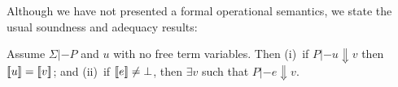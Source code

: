 \begin{comment}
Types do not matter at all for our denotational semantics.
\begin{lemma}[Type irrelevance]
It is the case that $\interp{u}{\sigma}{\rho} = \interp{u[\ol{\tau}/\as]}{\sigma}{\rho}$
for any type substitution of variable $\as$ to types $\taus$.
\end{lemma}
The following is an essential lemma for establishing the soundness of denotational semantics:
\begin{lemma}[Substitutivity]
If $\Sigma;\Delta,x{:}\tau |- e : \tau$ and $\rho$ is a semantic environment
and $\Sigma;\Delta |- e' : \tau'$ then
\[ \interp{e}{\sigma}{\rho,x |-> \interp{e'}{\sigma}{\rho}} = \interp{e[e'/x]}{\sigma}{\rho} \]
and if $\Sigma;\Delta,x{:}\tau |- u : \tau$ then
\[ \interp{u}{\sigma}{\rho,x |-> \interp{e'}{\sigma}{\rho}} = \interp{u[e'/x]}{\sigma}{\rho} \]
\end{lemma}
\end{comment}
Although we have not presented a formal operational semantics, we state the usual
soundness and adequacy results:
\begin{theorem}\label{thm:adequacy}
Assume $\Sigma |- P$ and $u$ with no free term variables. Then (i)~if $P |- u \Downarrow v$ then $[\![u]\!] = [\![v]\!] $; and (ii)~if $[\![e]\!] \neq \bot$, then
$\exists v$ such that $P |- e \Downarrow v$.
\end{theorem}
\begin{comment}
The proof of this theorem is also standard domain theory so we only sketch the
high-level road-map: The proof proceeds by defining a {\em logical relation} between
semantics and syntax, via the use of a bi-functor on admissible relations between elements
of $D_\infty$ and closed expressions, and using minimal
invariance~\cite{pitts-rel-domains} to show that this
bi-functor has a fixpoint. Adequacy then follows from the {\em fundamental theorem} of this
logical relation, which asserts that every expression is related to its denotation.
\end{comment}

